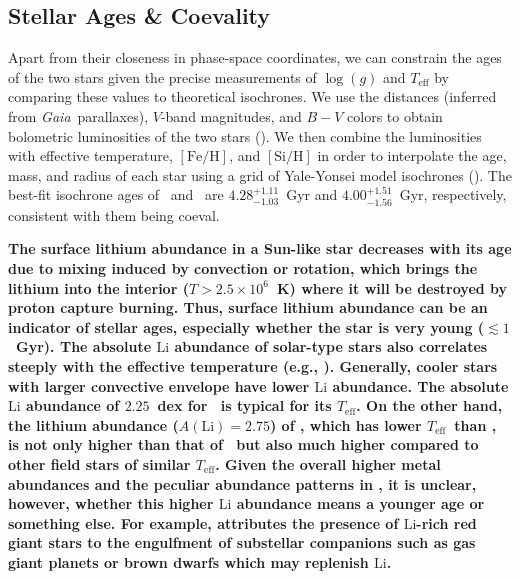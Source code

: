 \documentclass[modern, letterpaper]{aastex61}
\newcommand{\project}[1]{\textsl{#1}}
\newcommand{\gaia}{\project{Gaia}}
\newcommand*\elem[1]{\ensuremath{\mathrm{#1}}}
\newcommand*\elemH[1]{\ensuremath{[\mathrm{#1}/\elem{H}]}}
\newcommand*\teff{\ensuremath{T_\mathrm{eff}}}
\newcommand{\sunanalog}{\text{Krios}}
\newcommand{\bizarreone}{\text{Kronos}}
\begin{document}
\subsection{Stellar Ages \& Coevality}
\label{sub:ages}

Apart from their closeness in phase-space coordinates,
we can constrain the ages of the two stars
given the precise measurements of $\log(g)$ and $T_\mathrm{eff}$
by comparing these values to theoretical isochrones.
We use the distances (inferred from \gaia\ parallaxes), $V$-band magnitudes,
and $B-V$ colors to obtain bolometric luminosities of the two stars
(\citealt{2003AJ....126..778V}).
We then combine the luminosities with effective temperature, \elemH{Fe}, and
\elemH{Si} in order to interpolate the age, mass, and radius of each star using
a grid of Yale-Yonsei model isochrones (\citealt{2013ApJ...776...87S}).
The best-fit isochrone ages of \bizarreone\ and \sunanalog\ are
$4.28_{-1.03}^{+1.11}$~Gyr and $4.00_{-1.56}^{+1.51}$~Gyr, respectively,
consistent with them being coeval.

{\bf
The surface lithium abundance in a Sun-like star decreases with its age due to
mixing induced by convection or rotation, which brings the lithium into the
interior ($T>2.5 \times 10^{6}$~K) where it will be destroyed by proton capture
burning.
Thus, surface lithium abundance can be an indicator of stellar ages,
especially whether the star is very young ($\lesssim 1$~Gyr).
The absolute $\elem{Li}$ abundance of solar-type stars also correlates steeply
with the effective temperature (e.g., \citealt{Chen2001,2012ApJ...756...46R}).
Generally, cooler stars with larger convective envelope have lower \elem{Li}
abundance.
The absolute $\elem{Li}$ abundance of $2.25$~dex for \sunanalog\
is typical for its \teff.
On the other hand, the lithium abundance ($A(\elem{Li}) = 2.75$) of \bizarreone,
which has lower \teff\ than \sunanalog, is not only higher than that of
\sunanalog\ but also much higher compared to other field stars of similar \teff.
Given the overall higher metal abundances and the peculiar abundance patterns
in \bizarreone, it is unclear, however, whether this higher $\elem{Li}$
abundance means a younger age or something else.
For example, \citealt{Casey:2016aa} attributes the presence of $\elem{Li}$-rich
red giant stars to the engulfment of substellar companions such as gas giant
planets or brown dwarfs which may replenish $\elem{Li}$.
}
\end{document}
